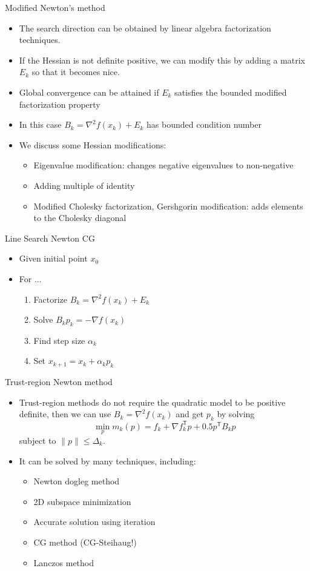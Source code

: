 \documentclass{beamer}
\newcommand{\tran}{\mathsf{T}}
\begin{document}
\begin{frame}[allowframebreaks]{Modified Newton's method}
\begin{itemize}
	\item The search direction can be obtained by linear algebra factorization techniques.
	\item If the Hessian is not definite positive, we can modify this by adding a matrix $E_k$ so that it becomes nice.
	\item Global convergence can be attained if $E_k$ satisfies the bounded modified factorization property
	\item In this case $B_k = \nabla^2 f(x_k) + E_k$ has bounded condition number
	\item We discuss some Hessian modifications:
	\begin{itemize}
		\item Eigenvalue modification: changes negative eigenvalues to non-negative
		\item Adding multiple of identity
		\item Modified Cholesky factorization, Gershgorin modification: adds elements to the Cholesky diagonal
	\end{itemize}
\end{itemize}

\begin{block}{Line Search Newton CG}
	\begin{itemize}
		\item Given initial point $x_0$
		\item For ...
		\begin{enumerate}
			\item Factorize $B_k = \nabla^2 f(x_k) + E_k$
			\item Solve $B_k p_k = -\nabla f(x_k)$
			\item Find step size $\alpha_k$
			\item Set $x_{k+1} = x_k + \alpha_k p_k$ 
		\end{enumerate}
	\end{itemize}
\end{block}
\end{frame}

\begin{frame}{Trust-region Newton method}
	\begin{itemize}
		\item Trust-region methods do not require the quadratic model to be positive definite, then we can use $B_k = \nabla^2 f(x_k)$ and get $p_k$ by solving
		\[
		\min_{p} m_k(p)= f_k + \nabla f_k^\tran p + 0.5 p^\tran B_k p
		\]
		subject to $\| p \| \leq \Delta_k$.
		\item It can be solved by many techniques, including:
		\begin{itemize}
			\item Newton dogleg method
			\item 2D subspace minimization
			\item Accurate solution using iteration
			\item CG method (CG-Steihaug!)
			\item Lanczos method
		\end{itemize}
	\end{itemize}
\end{frame}
 
\end{document}
